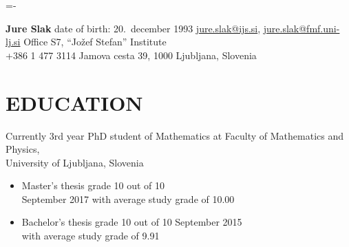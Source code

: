 \documentclass[line,margin]{res}
\newcommand{\wmeta}[1]{\sf#1\rm}
\begin{document}
\leftskip=-\hoffset
\advance\textwidth\hoffset %
\parindent=0pt
\parskip=2pt

{\bf \large Jure Slak} \hfill date of birth: 20.~december 1993
\vskip 2pt
\fullline
\href{mailto:jure.slak@ijs.si}{jure.slak@ijs.si},
\href{mailto:jure.slak@fmf.uni-lj.si}{jure.slak@fmf.uni-lj.si}
\hfill Office S7, ``Jožef Stefan'' Institute   \\
+386 1 477 3114 \hfill Jamova cesta 39, 1000 Ljubljana, Slovenia

\leftskip=0pt
\parskip=12pt

\section{EDUCATION}
\wmeta{Currently 3rd year PhD student of Mathematics at Faculty of Mathematics and Physics, \\
  University of Ljubljana, Slovenia}

\begin{itemize}
  \item Master's thesis grade 10 out of 10 \\  \hfill September 2017
  with average study grade of 10.00
  \item Bachelor's thesis grade 10 out of 10 \hfill September 2015 \\
  with average study grade of 9.91
\end{itemize}

\end{document}
